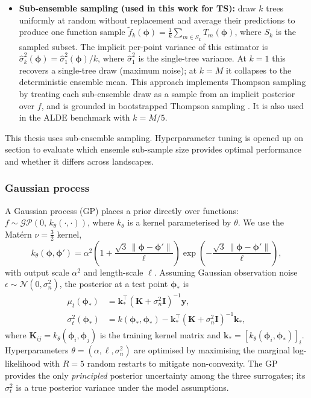 \begin{itemize}
  \item \textbf{Sub-ensemble sampling (used in this work for TS):} draw $k$ trees uniformly at random without replacement and average their predictions to produce one function sample $\tilde{f}_k(\boldsymbol{\phi}) = \frac{1}{k}\sum_{m \in S_k} T_m(\boldsymbol{\phi})$, where $S_k$ is the sampled subset. The implicit per-point variance of this estimator is $\hat{\sigma}^2_k(\boldsymbol{\phi}) = \hat{\sigma}^2_1(\boldsymbol{\phi}) / k$, where $\hat{\sigma}^2_1$ is the single-tree variance. At $k=1$ this recovers a single-tree draw (maximum noise); at $k=M$ it collapses to the deterministic ensemble mean. This approach implements Thompson sampling by treating each sub-ensemble draw as a sample from an implicit posterior over $f$, and is grounded in bootstrapped Thompson sampling . It is also used in the ALDE benchmark  with $k = M/5$.
\end{itemize}
This thesis uses sub-ensemble sampling. Hyperparameter tuning is opened up on section  to evaluate which ensemle sub-sample size provides optimal performance and whether it differs across landscapes.

\subsubsection{Gaussian process}

A Gaussian process (GP) places a prior directly over functions: $f \sim \mathcal{GP}(0,\, k_{\theta}(\cdot,\cdot))$, where $k_\theta$ is a kernel parameterised by $\theta$. We use the Mat\'{e}rn $\nu = \tfrac{3}{2}$ kernel,
\begin{equation}
k_\theta(\boldsymbol{\phi}, \boldsymbol{\phi}') = \alpha^2\!\left(1 + \frac{\sqrt{3}\,\|\boldsymbol{\phi}-\boldsymbol{\phi}'\|}{\ell}\right)\exp\!\left(-\frac{\sqrt{3}\,\|\boldsymbol{\phi}-\boldsymbol{\phi}'\|}{\ell}\right),
\end{equation}
with output scale $\alpha^2$ and length-scale $\ell$. Assuming Gaussian observation noise $\epsilon \sim \mathcal{N}(0, \sigma_n^2)$, the posterior at a test point $\boldsymbol{\phi}_*$ is
\begin{align}
\mu_t(\boldsymbol{\phi}_*) &= \mathbf{k}_*^\top\!\left(\mathbf{K} + \sigma_n^2\mathbf{I}\right)^{-1}\mathbf{y}, \\
\sigma_t^2(\boldsymbol{\phi}_*) &= k(\boldsymbol{\phi}_*,\boldsymbol{\phi}_*) - \mathbf{k}_*^\top\!\left(\mathbf{K} + \sigma_n^2\mathbf{I}\right)^{-1}\mathbf{k}_*,
\end{align}
where $\mathbf{K}_{ij} = k_\theta(\boldsymbol{\phi}_i, \boldsymbol{\phi}_j)$ is the training kernel matrix and $\mathbf{k}_* = [k_\theta(\boldsymbol{\phi}_i, \boldsymbol{\phi}_*)]_i$. Hyperparameters $\theta = (\alpha, \ell, \sigma_n^2)$ are optimised by maximising the marginal log-likelihood with $R = 5$ random restarts to mitigate non-convexity. The GP provides the only \emph{principled} posterior uncertainty among the three surrogates; its $\sigma_t^2$ is a true posterior variance under the model assumptions.

